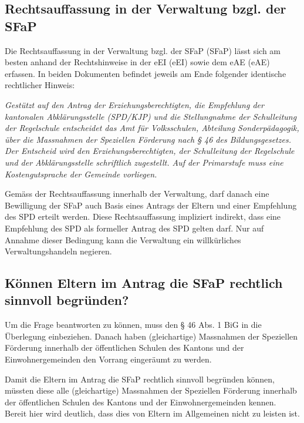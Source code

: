\documentclass[paper=a4, onesite]{scrreprt}
\newcounter{rz}
\newcommand{\Rz}{\addtocounter{rz}{1}\marginpar{\texttt{(\textit{\arabic{rz}})}}}
\begin{document}
\subsection{Rechtsauffassung in der Verwaltung bzgl. der \ac{SFaP}} \label{Rechtsauffasung}
\Rz Die Rechtsauffassung  in der Verwaltung bzgl. der \acl{SFaP} (\ac{SFaP}) lässt sich am besten anhand der Rechtshinweise in der \acl{eEI} (\ac{eEI}) sowie dem \acl{eAE} (\ac{eAE}) erfassen. In beiden Dokumenten befindet jeweils am Ende folgender identische rechtlicher Hinweis:\\
\label{rechtshinweis}\Rz
\begin{addmargin}[2.5em]{0em}\emph{Gestützt auf den Antrag der Erziehungsberechtigten, die Empfehlung der kantonalen Abklärungsstelle (SPD/KJP) und die Stellungnahme der Schulleitung der Regelschule entscheidet das Amt für Volksschulen, Abteilung Sonderpädagogik, über die Massnahmen der Speziellen Förderung nach § 46 des Bildungsgesetzes. Der Entscheid wird den Erziehungsberechtigten, der Schulleitung der Regelschule und der Abklärungsstelle schriftlich zugestellt. Auf der Primarstufe muss eine Kostengutsprache der Gemeinde vorliegen.\\
}\end{addmargin}    

\Rz Gemäss der Rechtsauffassung innerhalb der Verwaltung, darf danach eine Bewilligung der \ac{SFaP} auch Basis eines Antrags der Eltern und einer Empfehlung des \ac{SPD} erteilt werden. Diese Rechtsauffassung impliziert indirekt, dass eine Empfehlung des \ac{SPD} als formeller Antrag des \ac{SPD} gelten darf. Nur auf Annahme dieser Bedingung kann die Verwaltung ein willkürliches Verwaltungshandeln negieren. 

\subsection{Können Eltern im Antrag die \ac{SFaP} rechtlich sinnvoll begründen?}
\Rz Um die Frage beantworten zu können, muss den § 46 Abs. 1 \ac{BiG} in die Überlegung einbeziehen. Danach haben (gleichartige) Massnahmen der Speziellen Förderung innerhalb der öffentlichen Schulen des Kantons und der Einwohnergemeinden den Vorrang eingeräumt zu werden.\\

\Rz Damit die Eltern im Antrag die \ac{SFaP} rechtlich sinnvoll begründen können, müssten diese alle (gleichartige) Massnahmen der Speziellen Förderung innerhalb der öffentlichen Schulen des Kantons und der Einwohnergemeinden kennen. Bereit hier wird deutlich, dass dies von Eltern im Allgemeinen nicht zu leisten ist.\\ 
\end{document}
